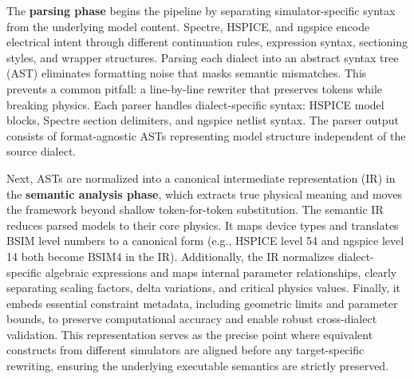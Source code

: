 \documentclass[conference]{IEEEtran}
\begin{document}
The \textbf{parsing phase} begins the pipeline by separating simulator-specific syntax from the underlying model content. Spectre, HSPICE, and ngspice encode electrical intent through different continuation rules, expression syntax, sectioning styles, and wrapper structures. Parsing each dialect into an abstract syntax tree (AST) eliminates formatting noise that masks semantic mismatches. This prevents a common pitfall: a line-by-line rewriter that preserves tokens while breaking physics. Each parser handles dialect-specific syntax: HSPICE model blocks, Spectre section delimiters, and ngspice netlist syntax. The parser output consists of format-agnostic ASTs representing model structure independent of the source dialect.

Next, ASTs are normalized into a canonical intermediate representation (IR) in the \textbf{semantic analysis phase}, which extracts true physical meaning and moves the framework beyond shallow token-for-token substitution. The semantic IR reduces parsed models to their core physics. It maps device types and translates BSIM level numbers to a canonical form (e.g., HSPICE level 54 and ngspice level 14 both become BSIM4 in the IR). Additionally, the IR normalizes dialect-specific algebraic expressions and maps internal parameter relationships, clearly separating scaling factors, delta variations, and critical physics values. Finally, it embeds essential constraint metadata, including geometric limits and parameter bounds, to preserve computational accuracy and enable robust cross-dialect validation. This representation serves as the precise point where equivalent constructs from different simulators are aligned before any target-specific rewriting, ensuring the underlying executable semantics are strictly preserved.
\end{document}

